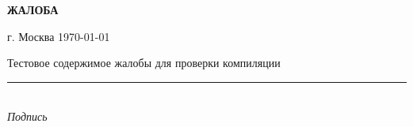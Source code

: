 \documentclass[12pt,a4paper]{article}
\begin{document}
\begin{center}
\textbf{\Large ЖАЛОБА}
\end{center}

\vspace{1cm}

\begin{flushright}
г. Москва \hspace{2cm} \today
\end{flushright}

\vspace{1cm}

Тестовое содержимое жалобы для проверки компиляции

\vspace{1cm}

\begin{center}
\rule{6cm}{0.5pt} \\
\textit{Подпись} \\
\vspace{0.5cm} \\
[ФИО]
\end{center}
\end{document}

